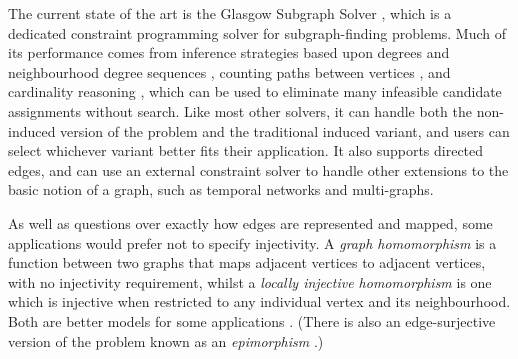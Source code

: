 \documentclass{article}
\begin{document}
The current state of the art is the Glasgow Subgraph Solver \cite{DBLP:conf/gg/McCreeshP020}, which
is a dedicated constraint programming solver for subgraph-finding problems. Much of its performance
comes from inference strategies based upon degrees and neighbourhood degree sequences
\cite{DBLP:journals/constraints/ZampelliDS10}, counting paths between vertices
\cite{DBLP:conf/cp/AudemardLMGP14,DBLP:conf/cp/McCreeshP15}, and cardinality reasoning
\cite{DBLP:journals/ai/Solnon10}, which can be used to eliminate many infeasible candidate
assignments without search. Like most other solvers, it can handle both the non-induced version of
the problem and the traditional induced variant, and users can select whichever variant
better fits their application. It also supports directed edges, and can use an external constraint
solver to handle other extensions to the basic notion of a graph, such as temporal networks and
multi-graphs.

As well as questions over exactly how edges are represented and mapped, some applications would
prefer not to specify injectivity. A \emph{graph homomorphism} is a function between two graphs that
maps adjacent vertices to adjacent vertices, with no injectivity requirement, whilst a \emph{locally
injective homomorphism} is one which is injective when restricted to any individual vertex and its
neighbourhood. Both are better models for some applications
\cite{DBLP:journals/dam/FialaKK01,DBLP:conf/semweb/Baget05,DBLP:conf/iccs/CorbyF07,DBLP:journals/csr/FialaK08,DBLP:journals/pvldb/FanLMWW10,DBLP:journals/tcs/ChaplickFHPT15}.
(There is also an edge-surjective version of the problem known as an \emph{epimorphism}
\cite{DBLP:journals/dam/GayFMSS14}.)
\end{document}
